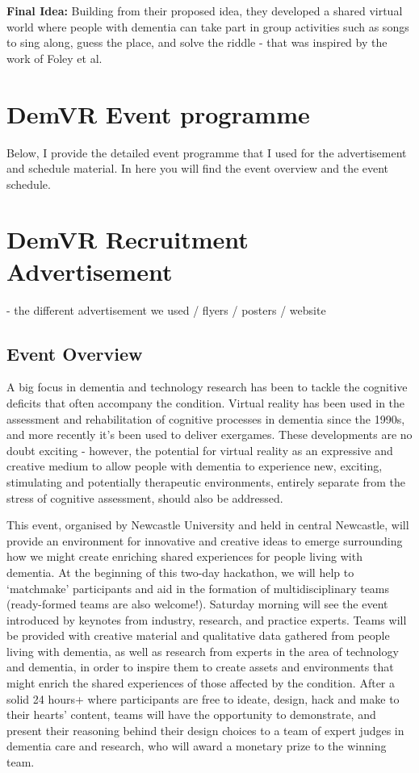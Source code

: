 \textbf{Final Idea:} Building from their proposed idea, they developed a shared virtual world where people with dementia can take part in group activities such as songs to sing along, guess the place, and solve the riddle - that was inspired by the work of Foley et al. \citep{foley_printer_2019}

\section{DemVR Event programme}
\label{app:DemVREvent}
Below, I provide the detailed event programme that I used for the advertisement and schedule material. In here you will find the event overview and the event schedule. 

\section{DemVR Recruitment Advertisement}
\label{app:DemVRRecruitment}
- the different advertisement we used / flyers / posters / website

\subsection{Event Overview}
\label{app:DemVR:Overview}
A big focus in dementia and technology research has been to tackle the cognitive deficits that often accompany the condition. Virtual reality has been used in the assessment and rehabilitation of cognitive processes in dementia since the 1990s, and more recently it's been used to deliver exergames. These developments are no doubt exciting - however, the potential for virtual reality as an expressive and creative medium to allow people with dementia to experience new, exciting, stimulating and potentially therapeutic environments, entirely separate from the stress of cognitive assessment, should also be addressed.

This event, organised by Newcastle University and held in central Newcastle, will provide an environment for innovative and creative ideas to emerge surrounding how we might create enriching shared experiences for people living with dementia. At the beginning of this two-day hackathon, we will help to `matchmake' participants and aid in the formation of multidisciplinary teams (ready-formed teams are also welcome!). Saturday morning will see the event introduced by keynotes from industry, research, and practice experts. Teams will be provided with creative material and qualitative data gathered from people living with dementia, as well as research from experts in the area of technology and dementia, in order to inspire them to create assets and environments that might enrich the shared experiences of those affected by the condition. After a solid 24 hours+ where participants are free to ideate, design, hack and make to their hearts' content, teams will have the opportunity to demonstrate, and present their reasoning behind their design choices to a team of expert judges in dementia care and research, who will award a monetary prize to the winning team.   

